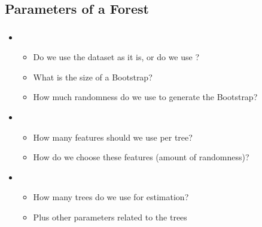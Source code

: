 \documentclass[xcolor=table]{beamer}
\begin{document}
\subsection{Parameters of a Forest}

\begin{frame}
	\frametitle{\insertsection}
	\framesubtitle{\insertsubsection}
	
	\begin{itemize}
		\item {}
		\begin{itemize}
			\item Do we use the dataset as it is, or do we use ?
			\item What is the size of a Bootstrap?
			\item How much randomness do we use to generate the Bootstrap?
		\end{itemize}
		\item {}
		\begin{itemize}
			\item How many features should we use per tree?
			\item How do we choose these features (amount of randomness)?
		\end{itemize}
		\item {}
		\begin{itemize}
			\item How many trees do we use for estimation?
			\item Plus other parameters related to the trees
		\end{itemize}
	\end{itemize}
	
\end{frame}


\end{document}
